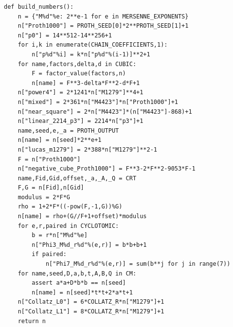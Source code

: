 \documentclass[11pt,a4paper]{article}
\theoremstyle{definition}\newtheorem{definition}[theorem]{Definition}
\theoremstyle{remark}\newtheorem{remark}[theorem]{Remark}
\begin{document}
\begin{lstlisting}[label=lst:verifier]
def build_numbers():
    n = {"M%d"%e: 2**e-1 for e in MERSENNE_EXPONENTS}
    n["Proth1000"] = PROTH_SEED[0]*2**PROTH_SEED[1]+1
    n["p0"] = 14**512-14**256+1
    for i,k in enumerate(CHAIN_COEFFICIENTS,1):
        n["p%d"%i] = k*n["p%d"%(i-1)]**2+1
    for name,factors,delta,d in CUBIC:
        F = factor_value(factors,n)
        n[name] = F**3-delta*F**2-d*F+1
    n["power4"] = 2*1241*n["M1279"]**4+1
    n["mixed"] = 2*361*n["M4423"]*n["Proth1000"]+1
    n["near_square"] = 2*n["M4423"]*(n["M4423"]-868)+1
    n["linear_2214_p3"] = 2214*n["p3"]+1
    name,seed,e,_a = PROTH_OUTPUT
    n[name] = n[seed]*2**e+1
    n["lucas_m1279"] = 2*388*n["M1279"]**2-1
    F = n["Proth1000"]
    n["negative_cube_Proth1000"] = F**3-2*F**2-9053*F-1
    name,Fid,Gid,offset,_a,_A,_Q = CRT
    F,G = n[Fid],n[Gid]
    modulus = 2*F*G
    rho = 1+2*F*((-pow(F,-1,G))%G)
    n[name] = rho+(G//F+1+offset)*modulus
    for e,r,paired in CYCLOTOMIC:
        b = r*n["M%d"%e]
        n["Phi3_M%d_r%d"%(e,r)] = b*b+b+1
        if paired:
            n["Phi7_M%d_r%d"%(e,r)] = sum(b**j for j in range(7))
    for name,seed,D,a,b,t,A,B,Q in CM:
        assert a*a+D*b*b == n[seed]
        n[name] = n[seed]*t*t+2*a*t+1
    n["Collatz_L0"] = 6*COLLATZ_R*n["M1279"]+1
    n["Collatz_L1"] = 8*COLLATZ_R*n["M1279"]+1
    return n


\end{lstlisting}
\end{document}
